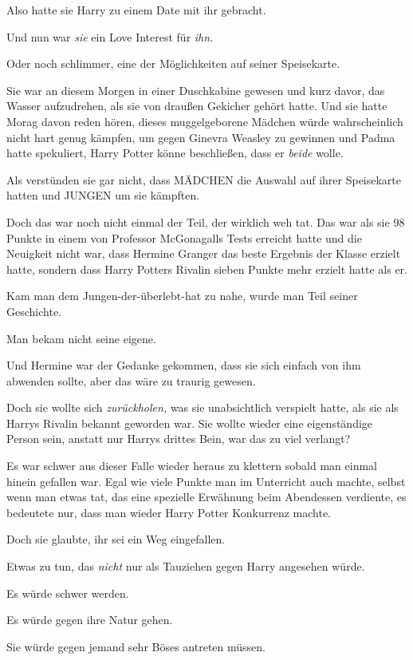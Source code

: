 {Also hatte sie Harry zu einem Date mit ihr gebracht.

Und nun war \emph{sie} ein Love Interest für \emph{ihn.}

Oder noch schlimmer, eine der Möglichkeiten auf seiner Speisekarte.

Sie war an diesem Morgen in einer Duschkabine gewesen und kurz davor, das Wasser aufzudrehen, als sie von draußen Gekicher gehört hatte. Und sie hatte Morag davon reden hören, dieses muggelgeborene Mädchen würde wahrscheinlich nicht hart genug kämpfen, um gegen Ginevra Weasley zu gewinnen und Padma hatte spekuliert, Harry Potter könne beschließen, dass er \emph{beide} wolle.

Als verstünden sie gar nicht, dass MÄDCHEN die Auswahl auf ihrer Speisekarte hatten und JUNGEN um sie kämpften.

Doch das war noch nicht einmal der Teil, der wirklich weh tat. Das war als sie 98 Punkte in einem von Professor McGonagalls Tests erreicht hatte und die Neuigkeit nicht war, dass Hermine Granger das beste Ergebnis der Klasse erzielt hatte, sondern dass Harry Potters Rivalin sieben Punkte mehr erzielt hatte als er.

Kam man dem Jungen-der-überlebt-hat zu nahe, wurde man Teil seiner Geschichte.

Man bekam nicht seine eigene.

Und Hermine war der Gedanke gekommen, dass sie sich einfach von ihm abwenden sollte, aber das wäre zu traurig gewesen.

Doch sie wollte sich \emph{zurückholen,} was sie unabsichtlich verspielt hatte, als sie als Harrys Rivalin bekannt geworden war. Sie wollte wieder eine eigenständige Person sein, anstatt nur Harrys drittes Bein, war das zu viel verlangt?

Es war schwer aus dieser Falle wieder heraus zu klettern sobald man einmal hinein gefallen war. Egal wie viele Punkte man im Unterricht auch machte, selbst wenn man etwas tat, das eine spezielle Erwähnung beim Abendessen verdiente, es bedeutete nur, dass man wieder Harry Potter Konkurrenz machte.

Doch sie glaubte, ihr sei ein Weg eingefallen.

Etwas zu tun, das \emph{nicht} nur als Tauziehen gegen Harry angesehen würde.

Es würde schwer werden.

Es würde gegen ihre Natur gehen.

Sie würde gegen jemand sehr Böses antreten müssen.

}

